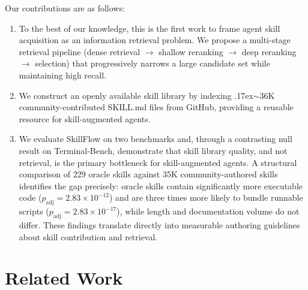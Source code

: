 \documentclass[11pt]{article}
\begin{document}
Our contributions are as follows:
\begin{enumerate}\setlength{\itemsep}{2pt}\setlength{\parskip}{0pt}\setlength{\parsep}{0pt}
  \item To the best of our knowledge, this is the first work to frame agent skill acquisition as an information retrieval problem. We propose a multi-stage retrieval pipeline (dense retrieval $\rightarrow$ shallow reranking $\rightarrow$ deep reranking $\rightarrow$ selection) that progressively narrows a large candidate set while maintaining high recall.
  \item We construct an openly available skill library by indexing {\raise.17ex\hbox{$\scriptstyle\sim$}}36K community-contributed SKILL.md files from GitHub, providing a reusable resource for skill-augmented agents.
  \item We evaluate SkillFlow on two benchmarks and, through a contrasting null result on Terminal-Bench, demonstrate that skill library quality, and not retrieval, is the primary bottleneck for skill-augmented agents. A structural comparison of 229 oracle skills against 35K community-authored skills identifies the gap precisely: oracle skills contain significantly more executable code ($p_{\text{adj}} = 2.83 \times 10^{-12}$) and are three times more likely to bundle runnable scripts ($p_{\text{adj}} = 2.83 \times 10^{-17}$), while length and documentation volume do not differ. These findings translate directly into measurable authoring guidelines about skill contribution and retrieval.
\end{enumerate}

\section{Related Work}
\label{sec:related_work}
\end{document}
